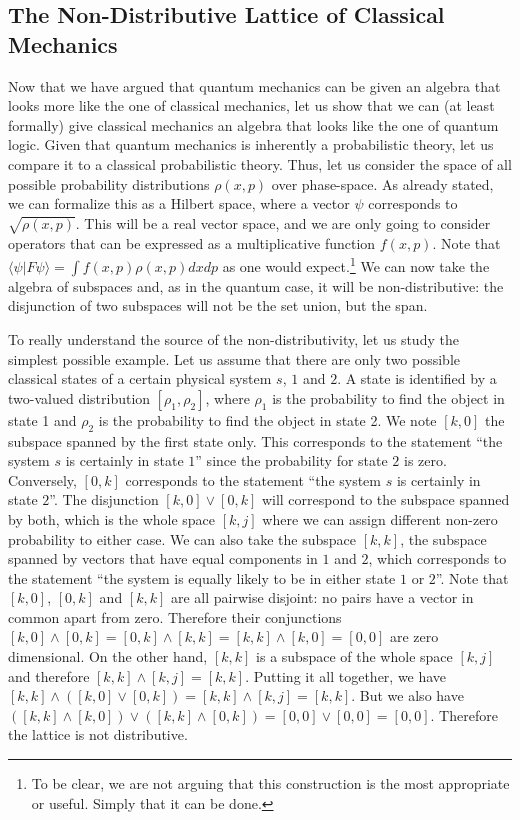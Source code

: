 \documentclass[11pt, executivepaper]{article}
\begin{document}
\subsection{The Non-Distributive Lattice of Classical Mechanics}

Now that we have argued that quantum mechanics can be given an algebra that looks more like the one of classical mechanics, let us show that we can (at least formally) give classical mechanics an algebra that looks like the one of quantum logic. Given that quantum mechanics is inherently a probabilistic theory, let us compare it to a classical probabilistic theory. Thus, let us consider the space of all possible probability distributions $\rho(x,p)$ over phase-space. As already stated, we can formalize this as a Hilbert space, where a vector $\psi$ corresponds to $\sqrt{\rho(x,p)}$. This will be a real vector space, and we are only going to consider operators that can be expressed as a multiplicative function $f(x,p)$. Note that $\langle \psi | F \psi \rangle = \int f(x,p) \rho(x,p) dx dp$ as one would expect.\footnote{To be clear, we are not arguing that this construction is the most appropriate or useful. Simply that it can be done.}  We can now take the algebra of subspaces and, as in the quantum case, it will be non-distributive: the disjunction of two subspaces will not be the set union, but the span.

To really understand the source of the non-distributivity, let us study the simplest possible example. Let us assume that there are only two possible classical states of a certain physical system $s$, $1$ and $2$. A state is identified by a two-valued distribution $[\rho_1, \rho_2]$, where $\rho_1$ is the probability to find the object in state 1 and $\rho_2$ is the probability to find the object in state 2. We note $[k,0]$ the subspace spanned by the first state only. This corresponds to the statement ``the system $s$ is certainly in state $1$'' since the probability for state $2$ is zero. Conversely, $[0,k]$ corresponds to the statement ``the system $s$ is certainly in state $2$''. The disjunction $[k,0] \vee [0,k]$ will correspond to the subspace spanned by both, which is the whole space $[k,j]$ where we can assign different non-zero probability to either case. We can also take the subspace $[k,k]$, the subspace spanned by vectors that have equal components in $1$ and $2$, which corresponds to the statement ``the system is equally likely to be in either state $1$ or $2$''. Note that $[k,0]$, $[0,k]$ and $[k,k]$ are all pairwise disjoint: no pairs have a vector in common apart from zero. Therefore their conjunctions $[k,0] \wedge [0,k] = [0,k] \wedge [k,k] = [k,k] \wedge [k,0] = [0,0]$ are zero dimensional. On the other hand, $[k,k]$ is a subspace of the whole space $[k,j]$ and therefore $[k,k] \wedge [k,j] = [k,k]$. Putting it all together, we have $[k,k] \wedge ( [k,0] \vee [0,k] ) = [k,k] \wedge [k,j] = [k,k]$. But we also have $( [k,k] \wedge [k,0] ) \vee ( [k,k] \wedge [0,k] ) = [0,0] \vee [0,0] = [0,0]$. Therefore the lattice is not distributive.
\end{document}
